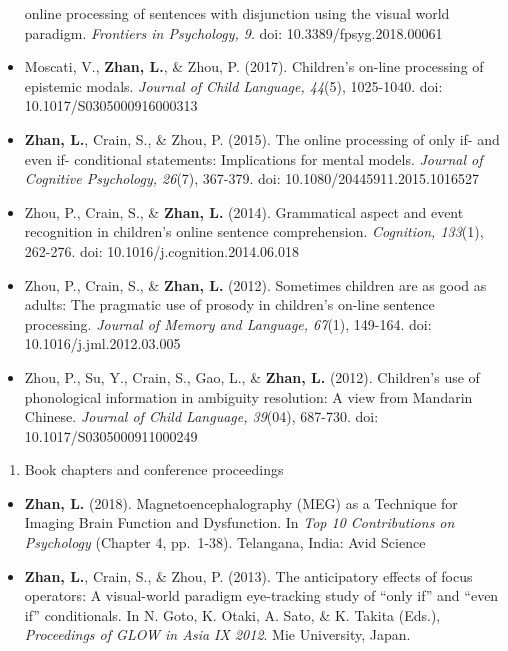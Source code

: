 \documentclass[
  12pt,
]{article}
\providecommand{\tightlist}{%
  \setlength{\itemsep}{0pt}\setlength{\parskip}{0pt}}
\begin{document}
\begin{itemize}
  online processing of sentences with disjunction using the visual world
  paradigm. \emph{Frontiers in Psychology, 9}. doi:
  10.3389/fpsyg.2018.00061
  \href{https://www.frontiersin.org/articles/10.3389/fpsyg.2018.00061/full}{
  \faFilePdf[regular] }
\item
  Moscati, V., \textbf{Zhan, L.}, \& Zhou, P. (2017). Children's on-line
  processing of epistemic modals. \emph{Journal of Child Language,
  44}(5), 1025-1040. doi: 10.1017/S0305000916000313
  \href{https://publications.likan.info/Periodicals/JChildLang2016.pdf}{
  \faFilePdf[regular] }
\item
  \textbf{Zhan, L.}, Crain, S., \& Zhou, P. (2015). The online
  processing of only if- and even if- conditional statements:
  Implications for mental models. \emph{Journal of Cognitive Psychology,
  26}(7), 367-379. doi: 10.1080/20445911.2015.1016527
  \href{https://publications.likan.info/Periodicals/JCognPsychol2015.pdf}{
  \faFilePdf[regular] }
\item
  Zhou, P., Crain, S., \& \textbf{Zhan, L.} (2014). Grammatical aspect
  and event recognition in children's online sentence comprehension.
  \emph{Cognition, 133}(1), 262-276. doi:
  10.1016/j.cognition.2014.06.018
  \href{http://publications.likan.info/Periodicals/Cognition2014.pdf}{
  \faFilePdf[regular] }
\item
  Zhou, P., Crain, S., \& \textbf{Zhan, L.} (2012). Sometimes children
  are as good as adults: The pragmatic use of prosody in children's
  on-line sentence processing. \emph{Journal of Memory and Language,
  67}(1), 149-164. doi: 10.1016/j.jml.2012.03.005
  \href{https://publications.likan.info/Periodicals/JMemLang2012.pdf}{
  \faFilePdf[regular] }
\item
  Zhou, P., Su, Y., Crain, S., Gao, L., \& \textbf{Zhan, L.} (2012).
  Children's use of phonological information in ambiguity resolution: A
  view from Mandarin Chinese. \emph{Journal of Child Language, 39}(04),
  687-730. doi: 10.1017/S0305000911000249
  \href{https://publications.likan.info/Periodicals/JChildLang2012.pdf}{
  \faFilePdf[regular] }
\end{itemize}

\begin{enumerate}
\def\labelenumi{\arabic{enumi}.}
\setcounter{enumi}{2}
\tightlist
\item
  Book chapters and conference proceedings
\end{enumerate}

\begin{itemize}
\item
  \textbf{Zhan, L.} (2018). Magnetoencephalography (MEG) as a Technique
  for Imaging Brain Function and Dysfunction. In \emph{Top 10
  Contributions on Psychology} (Chapter 4, pp.~1-38). Telangana, India:
  Avid Science
\item
  \textbf{Zhan, L.}, Crain, S., \& Zhou, P. (2013). The anticipatory
  effects of focus operators: A visual-world paradigm eye-tracking study
  of ``only if'' and ``even if'' conditionals. In N. Goto, K. Otaki, A.
  Sato, \& K. Takita (Eds.), \emph{Proceedings of GLOW in Asia IX 2012}.
  Mie University, Japan.
\end{itemize}
\end{document}
